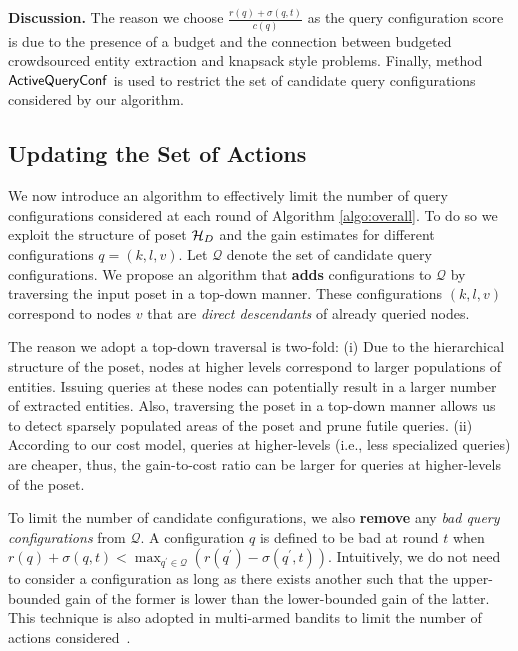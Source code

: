 \iftr
\vspace{2pt}\noindent\textbf{Discussion.} The reason we choose $\frac{r(q) + \sigma(q,t)}{c(q)}$ as the query configuration score is due to the presence of a budget and the connection between budgeted crowdsourced entity extraction and knapsack style problems. Finally, method ${\sf ActiveQueryConf}$ is used to restrict the set of candidate query configurations considered by our algorithm. 
\fi

\subsection{Updating the Set of Actions}
\label{sec:badactions}
We now introduce an algorithm to effectively limit the number of query configurations considered at each round of Algorithm \ref{algo:overall}. To do so we exploit the structure of poset $\mathcal{H}_D$ and the gain estimates for different configurations $q = (k,l,v)$. Let $\mathcal{Q}$ denote the set of candidate query configurations. We propose an algorithm that {\bf adds} configurations to $\mathcal{Q}$ by traversing the input poset in a top-down manner. These configurations $(k,l,v)$ correspond to nodes $v$ that are {\em direct descendants} of already queried nodes. 

\iftr
The reason we adopt a top-down traversal is two-fold: (i) Due to the hierarchical structure of the poset, nodes at higher levels correspond to larger populations of entities. Issuing queries at these nodes can potentially result in a larger number of extracted entities. Also, traversing the poset in a top-down manner allows us to detect sparsely populated areas of the poset and prune futile queries. (ii) According to our cost model, queries at higher-levels (i.e., less specialized queries) are cheaper, thus, the gain-to-cost ratio can be larger for queries at higher-levels of the poset.
\fi

To limit the number of candidate configurations, we also {\bf remove} any {\em bad query configurations} from $\mathcal{Q}$. A configuration $q$ is defined to be bad at round $t$ when $r(q) + \sigma(q,t) < \max_{q^{\prime} \in \mathcal{Q}} (r(q^{\prime}) - \sigma(q^{\prime},t))$. Intuitively, we do not need to consider a configuration as long as there exists another such that the upper-bounded gain of the former is lower than the lower-bounded gain of the latter. This technique is also adopted in multi-armed bandits to limit the number of actions considered~\cite{EvenDar06actionelimination}. 

